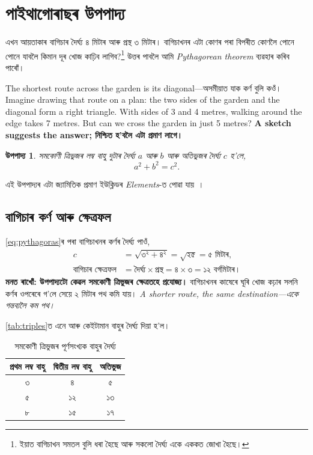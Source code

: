 \documentclass[11pt,a4paper]{article}
\newtheorem{theorem}{উপপাদ্য}[section]
\begin{document}
\section{পাইথাগোৰাছৰ উপপাদ্য}
এখন আয়তাকাৰ বাগিচাৰ দৈৰ্ঘ্য ৪ মিটাৰ আৰু প্ৰস্থ ৩ মিটাৰ। বাগিচাখনৰ এটা কোণৰ
পৰা বিপৰীত কোণলৈ পোনে পোনে যাবলৈ কিমান দূৰ খোজ কাঢ়িব লাগিব?\footnote{ইয়াত বাগিচাখন
সমতল বুলি ধৰা হৈছে আৰু সকলো দৈৰ্ঘ্য একে এককত জোখা হৈছে।}
উত্তৰ পাবলৈ আমি \textit{Pythagorean theorem} ব্যৱহাৰ কৰিব পাৰোঁ।

The shortest route across the garden is its diagonal—অসমীয়াত যাক কৰ্ণ বুলি কওঁ।
Imagine drawing that route on a plan: the two sides of the garden and the
diagonal form a right triangle. With sides of 3 and 4 metres, walking around
the edge takes 7 metres. But can we cross the garden in just 5 metres?
\textbf{A sketch suggests the answer; নিশ্চিত হ'বলৈ এটা প্ৰমাণ লাগে।}

\begin{theorem}
সমকোণী ত্ৰিভুজৰ লম্ব বাহু দুটাৰ দৈৰ্ঘ্য $a$ আৰু $b$ আৰু অতিভুজৰ দৈৰ্ঘ্য $c$ হ'লে,
\begin{equation}\label{eq:pythagoras}
  a^2+b^2=c^2.
\end{equation}
\end{theorem}
এই উপপাদ্যৰ এটা জ্যামিতিক প্ৰমাণ ইউক্লিডৰ \textit{Elements}-ত পোৱা যায়~\cite{euclid}।

\subsection{বাগিচাৰ কৰ্ণ আৰু ক্ষেত্ৰফল}
\eqref{eq:pythagoras}ৰ পৰা বাগিচাখনৰ কৰ্ণৰ দৈৰ্ঘ্য পাওঁ,
\begin{align*}
  c &= \sqrt{৩^{২}+৪^{২}}=\sqrt{২৫}=৫\text{ মিটাৰ},\\
  \text{বাগিচাৰ ক্ষেত্ৰফল} &= \text{দৈৰ্ঘ্য}\times\text{প্ৰস্থ}
    =৪\times৩=১২\text{ বৰ্গমিটাৰ।}
\end{align*}
\textbf{মনত ৰাখোঁ: উপপাদ্যটো কেৱল সমকোণী ত্ৰিভুজৰ ক্ষেত্ৰতহে প্ৰযোজ্য।}
বাগিচাখনৰ কাষেৰে ঘূৰি খোজ কঢ়াৰ সলনি কৰ্ণৰ ওপৰেৰে গ'লে সেয়ে ২ মিটাৰ পথ কমি যায়।
\textit{A shorter route, the same destination—একে গন্তব্যলৈ কম পথ।}

\autoref{tab:triples}ত এনে আৰু কেইটামান বাহুৰ দৈৰ্ঘ্য দিয়া হ'ল।
\begin{table}[ht]
  \centering
  \caption{সমকোণী ত্ৰিভুজৰ পূৰ্ণসংখ্যক বাহুৰ দৈৰ্ঘ্য}\label{tab:triples}
  \begin{tabular}{ccc}
    \hline
    প্ৰথম লম্ব বাহু & দ্বিতীয় লম্ব বাহু & অতিভুজ \\
    \hline
    ৩ & ৪ & ৫ \\
    ৫ & ১২ & ১৩ \\
    ৮ & ১৫ & ১৭ \\
    \hline
  \end{tabular}
\end{table}
\end{document}
